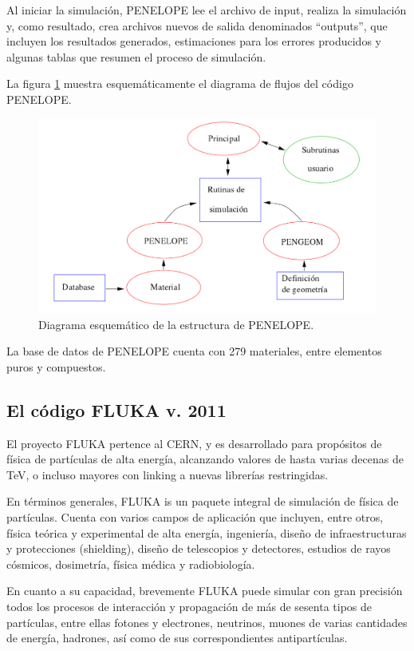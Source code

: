 Al iniciar la simulación, PENELOPE lee el archivo de input, realiza la simulación y, como resultado, crea archivos nuevos de salida denominados “outputs”, que incluyen los resultados generados, estimaciones para los errores producidos y algunas tablas que resumen el proceso de simulación.

La figura \ref{figPENELOPE} muestra esquemáticamente el diagrama de flujos del código PENELOPE.

\begin{figure}
 \centering
 \includegraphics[width = .75\textwidth]{figures/cap7/penelope.png}
 \caption{Diagrama esquemático de la estructura de PENELOPE.}
 \label{figPENELOPE}
\end{figure}

La base de datos de PENELOPE cuenta con 279 materiales, entre elementos puros y
compuestos.

\subsection{El c\'odigo FLUKA v. 2011}

El proyecto FLUKA pertence al CERN, y es desarrollado para propósitos de física de partículas de alta energía, alcanzando valores de hasta varias decenas de TeV, o incluso mayores con linking a nuevas librerías restringidas.

En términos generales, FLUKA is un paquete integral de simulación de física de partículas. Cuenta con varios campos de aplicación que incluyen, entre otros, física teórica y experimental de alta energía, ingeniería, diseño de infraestructuras y protecciones (shielding), diseño de telescopios y detectores, estudios de rayos cósmicos, dosimetría, física médica y radiobiología.

En cuanto a su capacidad, brevemente FLUKA puede simular con gran precisión todos los procesos de interacción y propagación de más de sesenta tipos de partículas, entre ellas fotones y electrones, neutrinos, muones de varias cantidades de energía, hadrones, así como de sus correspondientes antipartículas.

